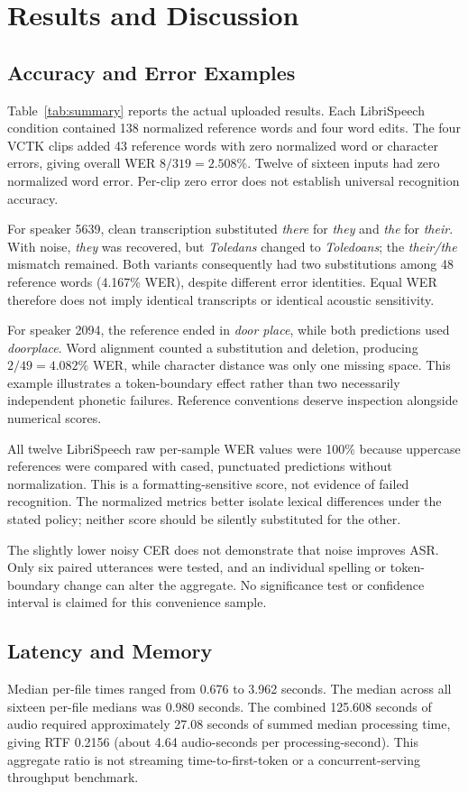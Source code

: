 \documentclass[conference]{IEEEtran}
\begin{document}
\section{Results and Discussion}
\subsection{Accuracy and Error Examples}
Table~\ref{tab:summary} reports the actual uploaded results. Each LibriSpeech condition contained 138 normalized reference words and four word edits. The four VCTK clips added 43 reference words with zero normalized word or character errors, giving overall WER $8/319=2.508\%$. Twelve of sixteen inputs had zero normalized word error. Per-clip zero error does not establish universal recognition accuracy.

For speaker 5639, clean transcription substituted \emph{there} for \emph{they} and \emph{the} for \emph{their}. With noise, \emph{they} was recovered, but \emph{Toledans} changed to \emph{Toledoans}; the \emph{their/the} mismatch remained. Both variants consequently had two substitutions among 48 reference words (4.167\% WER), despite different error identities. Equal WER therefore does not imply identical transcripts or identical acoustic sensitivity.

For speaker 2094, the reference ended in \emph{door place}, while both predictions used \emph{doorplace}. Word alignment counted a substitution and deletion, producing $2/49=4.082\%$ WER, while character distance was only one missing space. This example illustrates a token-boundary effect rather than two necessarily independent phonetic failures. Reference conventions deserve inspection alongside numerical scores.

All twelve LibriSpeech raw per-sample WER values were 100\% because uppercase references were compared with cased, punctuated predictions without normalization. This is a formatting-sensitive score, not evidence of failed recognition. The normalized metrics better isolate lexical differences under the stated policy; neither score should be silently substituted for the other.

The slightly lower noisy CER does not demonstrate that noise improves ASR. Only six paired utterances were tested, and an individual spelling or token-boundary change can alter the aggregate. No significance test or confidence interval is claimed for this convenience sample.

\subsection{Latency and Memory}
Median per-file times ranged from 0.676 to 3.962 seconds. The median across all sixteen per-file medians was 0.980 seconds. The combined 125.608 seconds of audio required approximately 27.08 seconds of summed median processing time, giving RTF 0.2156 (about 4.64 audio-seconds per processing-second). This aggregate ratio is not streaming time-to-first-token or a concurrent-serving throughput benchmark.
\end{document}
